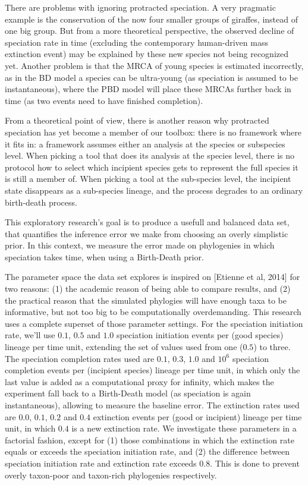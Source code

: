 \documentclass{article}
\begin{document}
There are problems with ignoring protracted speciation. A very pragmatic
example is the conservation of the now four smaller groups of giraffes,
instead of one big group. But from a more theoretical perspective, the
observed decline of speciation rate in time (excluding the contemporary human-driven
mass extinction event) may be explained by these new species not being 
recognized yet. Another problem is that the MRCA of young species is estimated 
incorrectly, as in the BD model a species can be ultra-young (as speciation
is assumed to be instantaneous), where the PBD model will place these MRCAs
further back in time (as two events need to have finished completion).

From a theoretical point of view, there is another reason why protracted
speciation has yet become a member of our toolbox: there is no framework
where it fits in: a framework assumes either an analysis at the species or
subspecies level. When picking a tool that does its analysis at the
species level, there is no protocol how to select which incipient species
gets to represent the full species it is still a member of. When picking
a tool at the sub-species level, the incipient state disappears as a
sub-species lineage, and the process degrades to an ordinary birth-death 
process.

This exploratory research's goal is to produce a 
usefull and balanced data set, that quantifies the inference error 
we make from choosing an overly simplistic prior. In this context, 
we measure the error made on phylogenies in which speciation takes 
time, when using a Birth-Death prior.

The parameter space the data set explores is inspired on 
[Etienne et al, 2014] for two reasons: (1) the academic
reason of being able to compare results, and (2) the practical
reason that the simulated phylogies will have enough taxa to
be informative, but not too big to be computationally overdemanding.
This research uses a complete superset of those parameter settings.
For the speciation initiation rate, we'll use $0.1$, $0.5$ and $1.0$ 
speciation initiation events per (good species) lineage per time unit, 
extending the set of
values used from one ($0.5$) to three. 
The speciation completion
rates used are $0.1$, $0.3$, $1.0$ and $10^6$ speciation completion
events per (incipient species) lineage per time unit, in which only
the last value is added as a computational proxy for infinity, which
makes the experiment fall back to a Birth-Death model (as speciation
is again instantaneous), allowing to measure the baseline error.
The extinction rates used are $0.0$, $0.1$, $0.2$ and $0.4$ 
extinction events per (good or incipient) lineage per time unit,
in which $0.4$ is a new extinction rate.
We investigate these parameters in a factorial fashion, except for
(1) those combinations in which the extinction rate equals or exceeds
the speciation initiation rate, and (2) the difference between
speciation initiation rate and extinction rate exceeds 0.8. This is
done to prevent overly taxon-poor and taxon-rich phylogenies respectively.
\end{document}
